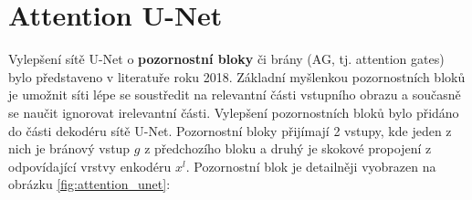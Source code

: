 \section{Attention U-Net}
\label{sec:Chapter24}

Vylepšení sítě U-Net o \textbf{pozornostní bloky} či brány (AG, tj. attention gates) bylo představeno v literatuře \cite{attentionunet} roku 2018. Základní myšlenkou pozornostních bloků je umožnit síti lépe se soustředit na relevantní části vstupního obrazu a současně se naučit ignorovat irelevantní části. Vylepšení pozornostních bloků bylo přidáno do části dekodéru sítě U-Net. Pozornostní bloky přijímají 2 vstupy, kde jeden z nich je bránový vstup $g$ z předchozího bloku a druhý je skokové propojení z odpovídající vrstvy enkodéru $x^l$. Pozornostní blok je detailněji vyobrazen na obrázku \ref{fig:attention_unet}:

